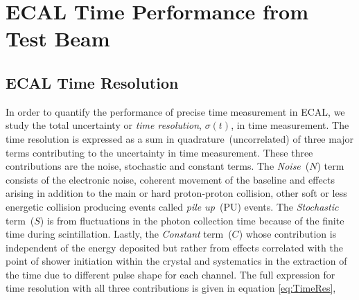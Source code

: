\section{ECAL Time Performance from Test Beam}
\subsection{ECAL Time Resolution}
In order to quantify the performance of precise time measurement in ECAL, we study the total uncertainty or \textit{time resolution}, $\sigma(t)$, in time measurement.%
The time resolution is expressed as a sum in quadrature~(uncorrelated) of three major terms contributing to the uncertainty in time measurement. These three contributions are the noise, stochastic and constant terms. The \textit{Noise}~($N$) term consists of the electronic noise, coherent movement of the baseline and effects arising in addition to the main or hard proton-proton collision, other soft or less energetic collision producing events called \textit{pile up}~(PU) events. The \textit{Stochastic} term~($S$) is from fluctuations in the photon collection time because of the finite time during \pb scintillation. Lastly, the \textit{Constant} term~($C$) whose contribution is independent of the energy deposited but rather from effects correlated with the point of shower initiation within the crystal and systematics in the extraction of the time due to different pulse shape for each channel.
The full expression for time resolution with all three contributions is given in equation \ref{eq:TimeRes},


